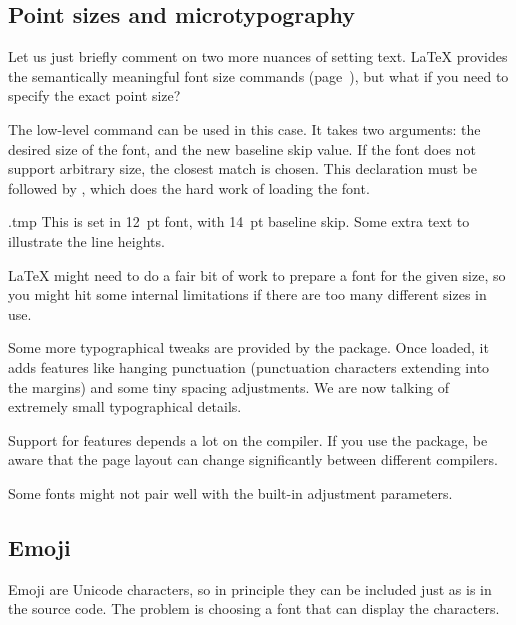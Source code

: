 %
%
\subsection{Point sizes and microtypography}

Let us just briefly comment on two more nuances of setting text.
\LaTeX{} provides the semantically meaningful font size commands (page~\pageref{sec:font size}),
but what if you need to specify the exact point size?

The low-level  command can be used in this case.
It takes two arguments: the desired size of the font, and the new baseline skip value.
If the font does not support arbitrary size, the closest match is chosen.
This declaration must be followed by ,
which does the hard work of loading the font.
%
\begin{VerbatimOut}{\jobname.tmp}
\fontsize{12pt}{14pt}\selectfont
This is set in 12~pt font,
with 14~pt baseline skip.
Some extra text to illustrate
the line heights.
\end{VerbatimOut}
\ShowExample

\begin{technote}
\LaTeX{} might need to do a fair bit of work to prepare a font for the given size,
so you might hit some internal limitations if there are too many different sizes in use.
\end{technote}

Some more typographical tweaks are provided by the  package.
Once loaded, it adds features like hanging punctuation
(punctuation characters extending into the margins) and some tiny spacing adjustments.
We are now talking of extremely small typographical details.

\begin{warning}
Support for  features depends a lot on the compiler.
If you use the package, be aware that the page layout can change significantly
between different compilers.
\end{warning}

\begin{warning}
Some fonts might not pair well with the built-in adjustment parameters.
\end{warning}


%
%
\subsection{Emoji}\label{sec:emoji}

Emoji are Unicode characters, so in principle they can be included just as is in the source code.
The problem is choosing a font that can display the characters.

